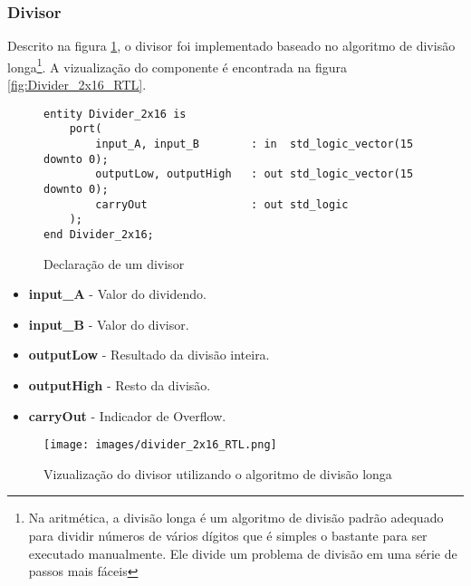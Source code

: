 \documentclass{article}
\newcommand\tab[1][0.50cm]{\hspace*{#1}}
\begin{document}
			\subsubsection[Divisor]{Divisor}
			\tab Descrito na figura \ref{fig:Divider_2x16}, o divisor foi implementado baseado no algoritmo de divis\~{a}o longa\footnote{Na aritm\'{e}tica, a divis\~{a}o longa \'{e} um algoritmo de divis\~{a}o padr\~{a}o adequado para dividir n\'{u}meros de v\'{a}rios d\'{i}gitos que \'{e} simples o bastante para ser executado manualmente. Ele divide um problema de divis\~{a}o em uma s\'{e}rie de passos mais f\'{a}ceis}. A vizualiza\c{c}\~{a}o do componente \'{e} encontrada na figura \ref{fig:Divider_2x16_RTL}.
			\begin{figure}[H]
				\centering
				\caption[Divisor]{Declara\c{c}\~{a}o de um divisor}
				\label{fig:Divider_2x16}
				\begin{lstlisting}[style=vhdl]
entity Divider_2x16 is
	port(
		input_A, input_B 		: in  std_logic_vector(15 downto 0);
		outputLow, outputHigh 	: out std_logic_vector(15 downto 0);
		carryOut 				: out std_logic
	);
end Divider_2x16;
				\end{lstlisting}
			\end{figure}
			\begin{itemize}
				\item \textbf{input\_A} - Valor do dividendo.
				\item \textbf{input\_B} - Valor do divisor.
				\item \textbf{outputLow} - Resultado da divis\~{a}o inteira.
				\item \textbf{outputHigh} - Resto da divis\~{a}o.
				\item \textbf{carryOut} - Indicador de Overflow.
			\end{itemize}
			\begin{figure}[H]
				\centering
				\caption[Vizualiza\c{c}\~{a}o do divisor]{Vizualiza\c{c}\~{a}o do divisor utilizando o algoritmo de divis\~{a}o longa}
				\label{fig:divider_2x16_RTL.png}
				\texttt{[image: images/divider\_2x16\_RTL.png]}
			\end{figure}
\end{document}
